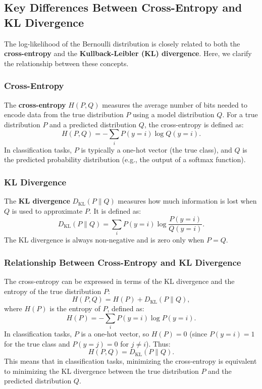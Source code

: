 \begin{notechapter}
\subsection{Key Differences Between Cross-Entropy and KL Divergence}
The log-likelihood of the Bernoulli distribution is closely related to both the \textbf{cross-entropy} and the \textbf{Kullback-Leibler (KL) divergence}. Here, we clarify the relationship between these concepts.

\subsubsection{Cross-Entropy}
The \textbf{cross-entropy} \( H(P, Q) \) measures the average number of bits needed to encode data from the true distribution \( P \) using a model distribution \( Q \). For a true distribution \( P \) and a predicted distribution \( Q \), the cross-entropy is defined as:
\[
H(P, Q) = -\sum_{i} P(y = i) \log Q(y = i).
\]
In classification tasks, \( P \) is typically a one-hot vector (the true class), and \( Q \) is the predicted probability distribution (e.g., the output of a softmax function).

\subsubsection{KL Divergence}
The \textbf{KL divergence} \( D_{\text{KL}}(P \parallel Q) \) measures how much information is lost when \( Q \) is used to approximate \( P \). It is defined as:
\[
D_{\text{KL}}(P \parallel Q) = \sum_{i} P(y = i) \log \frac{P(y = i)}{Q(y = i)}.
\]
The KL divergence is always non-negative and is zero only when \( P = Q \).

\subsubsection{Relationship Between Cross-Entropy and KL Divergence}
The cross-entropy can be expressed in terms of the KL divergence and the entropy of the true distribution \( P \):
\[
H(P, Q) = H(P) + D_{\text{KL}}(P \parallel Q),
\]
where \( H(P) \) is the entropy of \( P \), defined as:
\[
H(P) = -\sum_{i} P(y = i) \log P(y = i).
\]
In classification tasks, \( P \) is a one-hot vector, so \( H(P) = 0 \) (since \( P(y = i) = 1 \) for the true class and \( P(y = j) = 0 \) for \( j \neq i \)). Thus:
\[
H(P, Q) = D_{\text{KL}}(P \parallel Q).
\]
This means that in classification tasks, minimizing the cross-entropy is equivalent to minimizing the KL divergence between the true distribution \( P \) and the predicted distribution \( Q \).


\end{notechapter}
